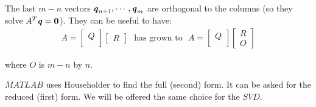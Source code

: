 The last $m-n$ vectors $\textbf{\textit{q}}_{n+1},\cdots,\textbf{\textit{q}}_{m}$ are orthogonal to the columns (so they solve $ A^{T}\textbf{\textit{q}}=\textbf{0}$). They can be useful to have:
\begin{align*}
A=
\begin{bmatrix}
Q \\
\
\end{bmatrix}
\begin{bmatrix}
R 
\end{bmatrix} \ \ \   \text{has grown to} \  \  \ 
A=
\begin{bmatrix}
Q \\
\
\end{bmatrix}
\begin{bmatrix}
R\\
\textit{O} 
\end{bmatrix}
\end{align*}
\begin{flushleft}
	where $\textit{O}$ is $m-n$ by $n$.
\end{flushleft}

 $MATLAB$ uses Householder to find the full (second) form. It can be asked for the reduced (first) form. We will be offered the same choice for the $SVD$.